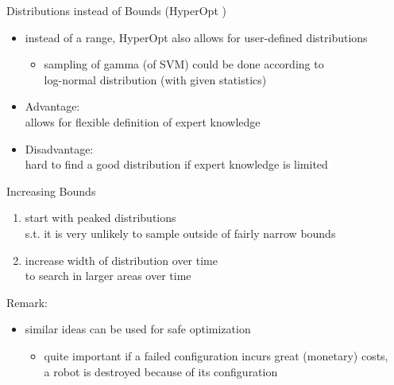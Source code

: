 \begin{frame}[c]{Distributions instead of Bounds (HyperOpt )}

\begin{itemize}
  \item instead of a range, HyperOpt also allows for user-defined distributions
  \begin{itemize}
    \item sampling of gamma (of SVM) could be done according to\\ log-normal distribution (with given statistics) 
  \end{itemize}
  \item Advantage:\\ allows for flexible definition of expert knowledge
  \item Disadvantage:\\ hard to find a good distribution if expert knowledge is limited
\end{itemize}

\end{frame}
\begin{frame}[c]{Increasing Bounds }

\begin{enumerate}
  \item start with peaked distributions \\ s.t. it is very unlikely to sample outside of fairly narrow bounds
  \item increase width of distribution over time\\ to search in larger areas over time
\end{enumerate}

\bigskip
\pause

Remark:
\begin{itemize}
  \item similar ideas can be used for safe optimization
  \begin{itemize}
    \item quite important if a failed configuration incurs great (monetary) costs, \\
          a robot is destroyed because of its configuration 
  \end{itemize}
\end{itemize}

\end{frame}

